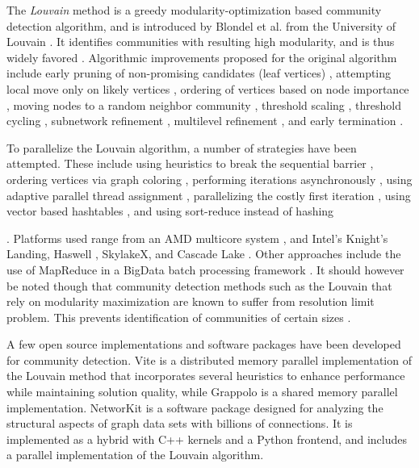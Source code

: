 The \textit{Louvain} method is a greedy modularity-optimization based community detection algorithm, and is introduced by Blondel et al. from the University of Louvain \cite{com-blondel08}. It identifies communities with resulting high modularity, and is thus widely favored \cite{com-lancichinetti09}. Algorithmic improvements proposed for the original algorithm include early pruning of non-promising candidates (leaf vertices) \cite{com-ryu16, com-halappanavar17, com-zhang21, com-you22}, attempting local move only on likely vertices \cite{com-ryu16, com-ozaki16, com-zhang21, com-shi21}, ordering of vertices based on node importance \cite{com-aldabobi22}, moving nodes to a random neighbor community \cite{com-traag15}, threshold scaling \cite{com-lu15, com-naim17, com-halappanavar17}, threshold cycling \cite{com-ghosh18}, subnetwork refinement \cite{com-waltman13, com-traag19}, multilevel refinement \cite{com-rotta11, com-gach14, com-shi21}, and early termination \cite{com-ghosh18}.

To parallelize the Louvain algorithm, a number of strategies have been attempted. These include using heuristics to break the sequential barrier \cite{com-lu15}, ordering vertices via graph coloring \cite{com-halappanavar17}, performing iterations asynchronously \cite{com-que15, com-shi21}, using adaptive parallel thread assignment \cite{com-fazlali17, com-naim17, com-sattar19, com-mohammadi20}, parallelizing the costly first iteration \cite{com-wickramaarachchi14}, using vector based hashtables \cite{com-halappanavar17}, and using sort-reduce instead of hashing \cite{com-cheong13}. Platforms used range from an AMD multicore system \cite{com-fazlali17}, and Intel’s Knight's Landing, Haswell \cite{com-gheibi20}, SkylakeX, and Cascade Lake \cite{part-hossain21}. Other approaches include the use of MapReduce in a BigData batch processing framework \cite{com-zeitz17}. It should however be noted though that community detection methods such as the Louvain that rely on modularity maximization are known to suffer from resolution limit problem. This prevents identification of communities of certain sizes \cite{com-ghosh19}.

A few open source implementations and software packages have been developed for community detection. Vite \cite{ghosh2018scalable} is a distributed memory parallel implementation of the Louvain method that incorporates several heuristics to enhance performance while maintaining solution quality, while Grappolo \cite{com-halappanavar17} is a shared memory parallel implementation. NetworKit \cite{staudt2016networkit} is a software package designed for analyzing the structural aspects of graph data sets with billions of connections. It is implemented as a hybrid with C++ kernels and a Python frontend, and includes a parallel implementation of the Louvain algorithm.


